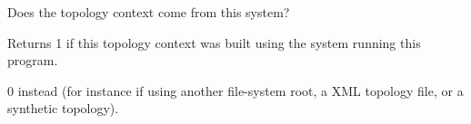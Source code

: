 Does the topology context come from this system? \begin{DoxyReturn}{Returns}
1 if this topology context was built using the system running this program. 

0 instead (for instance if using another file-\/system root, a XML topology file, or a synthetic topology). 
\end{DoxyReturn}
